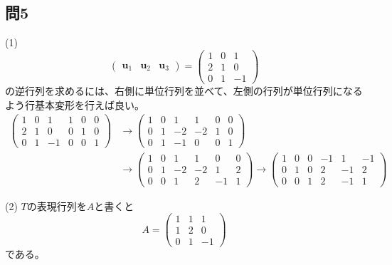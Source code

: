 \subsection{問5}
\noindent (1)
\[
\begin{pmatrix}
\bm{u}_1 & \bm{u}_2 & \bm{u}_3
\end{pmatrix}
=
\begin{pmatrix}
1 & 0 & 1 \\
2 & 1 & 0 \\
0 & 1 & -1
\end{pmatrix}
\]
の逆行列を求めるには、右側に単位行列を並べて、左側の行列が単位行列になるよう行基本変形を行えば良い。
\begin{align*}
\left(
\begin{array}{rrr|rrr}
1 & 0 & 1 & 1 & 0 & 0 \\
2 & 1 & 0 & 0 & 1 & 0 \\
0 & 1 & -1 & 0 & 0 & 1
\end{array}
\right)
&\rightarrow
\left(
\begin{array}{rrr|rrr}
1 & 0 & 1 & 1 & 0 & 0 \\
0 & 1 & -2 & -2 & 1 & 0 \\
0 & 1 & -1 & 0 & 0 & 1
\end{array}
\right) \\
&\rightarrow
\left(
\begin{array}{rrr|rrr}
1 & 0 & 1 & 1 & 0 & 0 \\
0 & 1 & -2 & -2 & 1 & 2 \\
0 & 0 & 1 & 2 & -1 & 1
\end{array}
\right)
\rightarrow
\left(
\begin{array}{rrr|rrr}
1 & 0 & 0 & -1 & 1 & -1 \\
0 & 1 & 0 & 2 & -1 & 2 \\
0 & 0 & 1 & 2 & -1 & 1
\end{array} \right)
\end{align*}

\noindent (2) $T$の表現行列を$A$と書くと
\[
A =
\begin{pmatrix}
1 & 1 & 1 \\
1 & 2 & 0 \\
0 & 1 & -1
\end{pmatrix}
\]
である。

